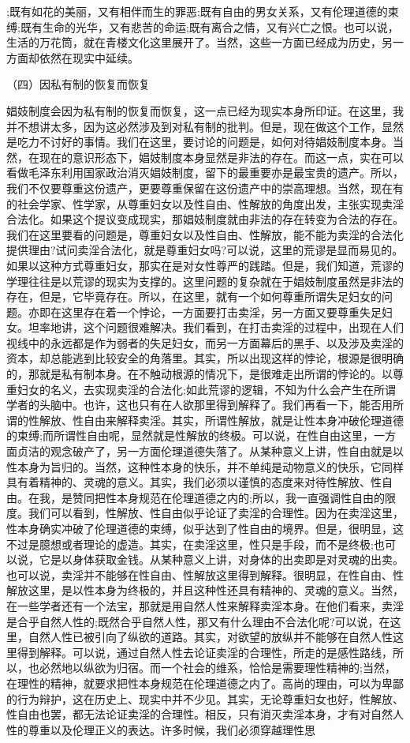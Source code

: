 \documentclass[a4paper]{article}
\begin{document}
;既有如花的美丽，又有相伴而生的罪恶;既有自由的男女关系，又有伦理道德的束缚;既有生命的光华，又有悲苦的命运;既有离合之情，又有兴亡之恨。也可以说，生活的万花筒，就在青楼文化这里展开了。当然，这些一方面已经成为历史，另一方面却依然在现实中延续。　

（四）因私有制的恢复而恢复

娼妓制度会因为私有制的恢复而恢复，这一点已经为现实本身所印证。在这里，我并不想讲太多，因为这必然涉及到对私有制的批判。但是，现在做这个工作，显然是吃力不讨好的事情。我们在这里，要讨论的问题是，如何对待娼妓制度本身。当然，在现在的意识形态下，娼妓制度本身显然是非法的存在。而这一点，实在可以看做毛泽东利用国家政治消灭娼妓制度，留下的最重要亦是最宝贵的遗产。所以，我们不仅要尊重这份遗产，更要尊重保留在这份遗产中的崇高理想。当然，现在有的社会学家、性学家，从尊重妇女以及性自由、性解放的角度出发，主张实现卖淫合法化。如果这个提议变成现实，那娼妓制度就由非法的存在转变为合法的存在。我们在这里要看的问题是，尊重妇女以及性自由、性解放，能不能为卖淫的合法化提供理由?试问卖淫合法化，就是尊重妇女吗?可以说，这里的荒谬是显而易见的。如果以这种方式尊重妇女，那实在是对女性尊严的践踏。但是，我们知道，荒谬的学理往往是以荒谬的现实为支撑的。这里问题的复杂就在于娼妓制度虽然是非法的存在，但是，它毕竟存在。所以，在这里，就有一个如何尊重所谓失足妇女的问题。亦即在这里存在着一个悖论，一方面要打击卖淫，另一方面又要尊重失足妇女。坦率地讲，这个问题很难解决。我们看到，在打击卖淫的过程中，出现在人们视线中的永远都是作为弱者的失足妇女，而另一方面幕后的黑手、以及涉及卖淫的资本，却总能逃到比较安全的角落里。其实，所以出现这样的悖论，根源是很明确的，那就是私有制本身。在不触动根源的情况下，是很难走出所谓的悖论的。以尊重妇女的名义，去实现卖淫的合法化;如此荒谬的逻辑，不知为什么会产生在所谓学者的头脑中。也许，这也只有在人欲那里得到解释了。我们再看一下，能否用所谓的性解放、性自由来解释卖淫。其实，所谓性解放，就是让性本身冲破伦理道德的束缚;而所谓性自由呢，显然就是性解放的终极。可以说，在性自由这里，一方面贞洁的观念破产了，另一方面伦理道德失落了。从某种意义上讲，性自由就是以性本身为旨归的。当然，这种性本身的快乐，并不单纯是动物意义的快乐，它同样具有着精神的、灵魂的意义。其实，我们必须以谨慎的态度来对待性解放、性自由。在我，是赞同把性本身规范在伦理道德之内的;所以，我一直强调性自由的限度。我们可以看到，性解放、性自由似乎论证了卖淫的合理性。因为在卖淫这里，性本身确实冲破了伦理道德的束缚，似乎达到了性自由的境界。但是，很明显，这不过是臆想或者理论的虚造。其实，在卖淫这里，性只是手段，而不是终极;也可以说，它是以身体获取金钱。从某种意义上讲，对身体的出卖即是对灵魂的出卖。也可以说，卖淫并不能够在性自由、性解放这里得到解释。很明显，在性自由、性解放这里，是以性本身为终极的，并且这种性还具有精神的、灵魂的意义。当然，在一些学者还有一个法宝，那就是用自然人性来解释卖淫本身。在他们看来，卖淫是合乎自然人性的;既然合乎自然人性，那又有什么理由不合法化呢?可以说，在这里，自然人性已被引向了纵欲的道路。其实，对欲望的放纵并不能够在自然人性这里得到解释。可以说，通过自然人性去论证卖淫的合理性，所走的是感性路线，所以，也必然地以纵欲为归宿。而一个社会的维系，恰恰是需要理性精神的;当然，在理性的精神，就要求把性本身规范在伦理道德之内了。高尚的理由，可以为卑鄙的行为辩护，这在历史上、现实中并不少见。其实，无论尊重妇女也好，性解放、性自由也罢，都无法论证卖淫的合理性。相反，只有消灭卖淫本身，才有对自然人性的尊重以及伦理正义的表达。许多时候，我们必须穿越理性思
\end{document}
